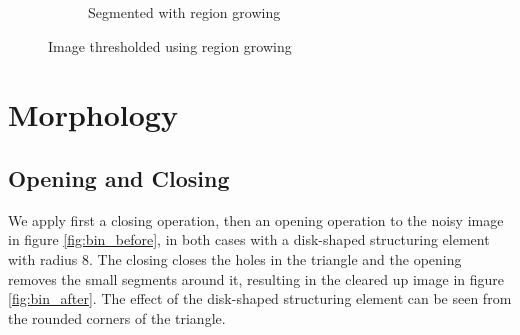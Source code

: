 \documentclass[]{article}
\begin{document}
\begin{figure}[H]
\begin{subfigure}{0.5\textwidth}
        \caption{Segmented with region growing}
    \end{subfigure}%
    \caption{Image thresholded using region growing}
    \label{fig:region_growing}
\end{figure}

\section{Morphology}
\subsection{Opening and Closing}
We apply first a closing operation, then an opening operation to the noisy image in figure \ref{fig:bin_before}, in both cases with a disk-shaped structuring element with radius $8$. The closing closes the holes in the triangle and the opening removes the small segments around it, resulting in the cleared up image in figure \ref{fig:bin_after}. The effect of the disk-shaped structuring element can be seen from the rounded corners of the triangle.
\end{document}
